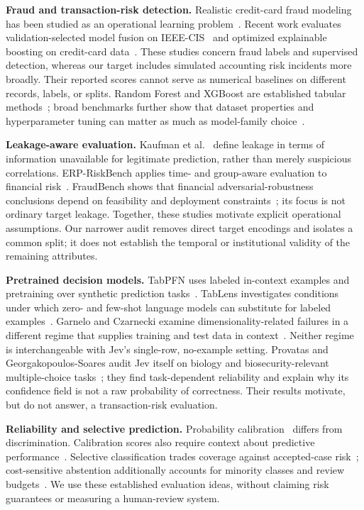 \documentclass{llncs}
\begin{document}
\textbf{Fraud and transaction-risk detection.} Realistic credit-card fraud modeling has been studied as an operational learning problem~\cite{dalpozzolo2018fraud}. Recent work evaluates validation-selected model fusion on IEEE-CIS~\cite{han2026fusion} and optimized explainable boosting on credit-card data~\cite{fazel2026ebm}. These studies concern fraud labels and supervised detection, whereas our target includes simulated accounting risk incidents more broadly. Their reported scores cannot serve as numerical baselines on different records, labels, or splits. Random Forest and XGBoost are established tabular methods~\cite{breiman2001forests,chen2016xgboost}; broad benchmarks further show that dataset properties and hyperparameter tuning can matter as much as model-family choice~\cite{grinsztajn2022trees,mcelfresh2023tabzilla}.

\textbf{Leakage-aware evaluation.} Kaufman et al.~\cite{kaufman2012leakage} define leakage in terms of information unavailable for legitimate prediction, rather than merely suspicious correlations. ERP-RiskBench applies time- and group-aware evaluation to financial risk~\cite{mishra2026erp}. FraudBench shows that financial adversarial-robustness conclusions depend on feasibility and deployment constraints~\cite{zeng2026fraudbench}; its focus is not ordinary target leakage. Together, these studies motivate explicit operational assumptions. Our narrower audit removes direct target encodings and isolates a common split; it does not establish the temporal or institutional validity of the remaining attributes.

\textbf{Pretrained decision models.} TabPFN uses labeled in-context examples and pretraining over synthetic prediction tasks~\cite{hollmann2025tabpfn}. TabLens investigates conditions under which zero- and few-shot language models can substitute for labeled examples~\cite{grushina2026llmtab}. Garnelo and Czarnecki examine dimensionality-related failures in a different regime that supplies training and test data in context~\cite{garnelo2026tabular}. Neither regime is interchangeable with Jev's single-row, no-example setting. Provatas and Georgakopoulos-Soares audit Jev itself on biology and biosecurity-relevant multiple-choice tasks~\cite{provatas2026systemone}; they find task-dependent reliability and explain why its confidence field is not a raw probability of correctness. Their results motivate, but do not answer, a transaction-risk evaluation.

\textbf{Reliability and selective prediction.} Probability calibration~\cite{guo2017calibration,haotian2023recal} differs from discrimination. Calibration scores also require context about predictive performance~\cite{chidambaram2025reassessing}. Selective classification trades coverage against accepted-case risk~\cite{geifman2017selective}; cost-sensitive abstention additionally accounts for minority classes and review budgets~\cite{singh2026abstention}. We use these established evaluation ideas, without claiming risk guarantees or measuring a human-review system.
\end{document}
